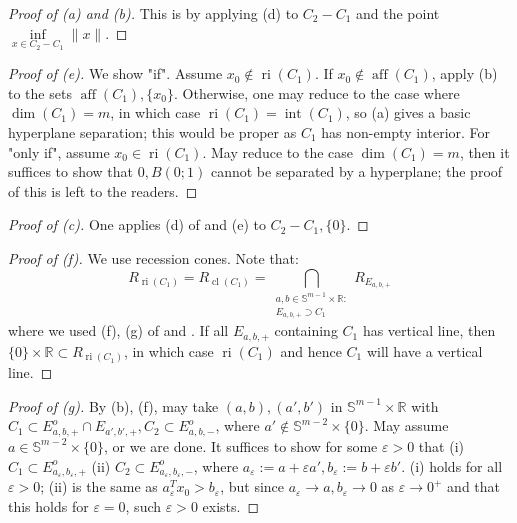 \begin{proof}[Proof of (a) and (b)]
	This is by applying (d) to $C_2-C_1$ and the point $\underset{x\in C_2-C_1}{\operatorname{inf}}\|x\|$.
\end{proof}
\begin{proof}[Proof of (e)]
	We show "if". Assume $x_0\notin \operatorname{ri}(C_1)$. If $x_0\notin \operatorname{aff}(C_1)$, apply (b) to the sets $\operatorname{aff}(C_1),\{x_0\}$. Otherwise, one may reduce to the case where $\dim(C_1)=m$, in which case $\operatorname{ri}(C_1)=\operatorname{int}(C_1)$, so (a) gives a basic hyperplane separation; this would be proper as $C_1$ has non-empty interior. For "only if", assume $x_0\in \operatorname{ri}(C_1)$. May reduce to the case $\dim(C_1)=m$, then it suffices to show that $0,B(0;1)$ cannot be separated by a hyperplane; the proof of this is left to the readers.
\end{proof}
\begin{proof}[Proof of (c)]
	One applies (d) of  and (e) to $C_2-C_1,\{0\}$.
\end{proof}
\begin{proof}[Proof of (f)]
	We use recession cones. Note that:
	\[
		R_{\operatorname{ri}(C_1)}=
		R_{\operatorname{cl}(C_1)}=
		\bigcap_{\substack{a,b\in \mathbb{S}^{m-1}\times \mathbb{R}:\\E_{a,b,+}\supset C_1}}R_{E_{a,b,+}}
	\]
	where we used (f), (g) of  and . If all $E_{a,b,+}$ containing $C_1$ has vertical line, then $\{0\}\times\mathbb{R}\subset R_{\operatorname{ri}(C_1)}$, in which case $\operatorname{ri}(C_1)$ and hence $C_1$ will have a vertical line.
\end{proof}
\begin{proof}[Proof of (g)]
	By (b), (f), may take $(a,b),(a',b')$ in $\mathbb{S}^{m-1}\times \mathbb{R}$ with $C_1\subset E^o_{a,b,+}\cap E_{a',b',+},C_2\subset E^o_{a,b,-}$, where $a'\notin \mathbb{S}^{m-2}\times \{0\}$. May assume $a\in \mathbb{S}^{m-2}\times \{0\}$, or we are done. It suffices to show for some $\varepsilon >0$ that (i) $C_1\subset E^o_{a_\varepsilon,b_\varepsilon,+}$ (ii) $C_2\subset E^o_{a_\varepsilon,b_\varepsilon,-}$, where $a_\varepsilon:=a+\varepsilon a',b_\varepsilon:=b+\varepsilon b'$. (i) holds for all $\varepsilon >0$; (ii) is the same as $a_\varepsilon^T x_0>b_\varepsilon $, but since $a_\varepsilon\to a,b_\varepsilon \to 0$ as $\varepsilon \to 0^+$ and that this holds for $\varepsilon =0$, such $\varepsilon >0$ exists.
\end{proof}

